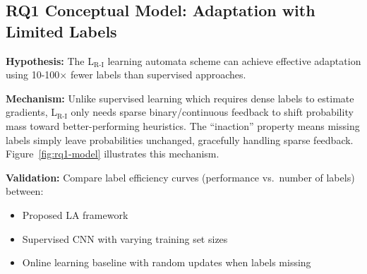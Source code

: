 \documentclass[12pt,oneside]{book}
\begin{document}
\subsection{RQ1 Conceptual Model: Adaptation with Limited Labels}
\label{subsec:rq1-model}

\textbf{Hypothesis:} The L$_\text{R-I}$ learning automata scheme can achieve effective adaptation using 10-100$\times$ fewer labels than supervised approaches.

\textbf{Mechanism:} Unlike supervised learning which requires dense labels to estimate gradients, L$_\text{R-I}$ only needs sparse binary/continuous feedback to shift probability mass toward better-performing heuristics. The ``inaction'' property means missing labels simply leave probabilities unchanged, gracefully handling sparse feedback. Figure~\ref{fig:rq1-model} illustrates this mechanism.

\textbf{Validation:} Compare label efficiency curves (performance vs.\ number of labels) between:
\begin{itemize}
    \item Proposed LA framework
    \item Supervised CNN with varying training set sizes
    \item Online learning baseline with random updates when labels missing
\end{itemize}
\end{document}
